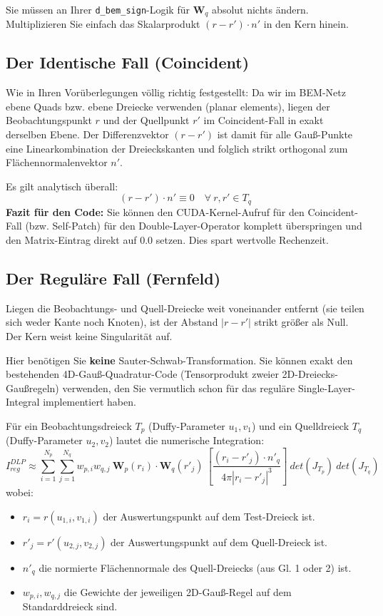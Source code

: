 \documentclass[11pt,a4paper]{article}
\begin{document}
Sie müssen an Ihrer \texttt{d\_bem\_sign}-Logik für $\mathbf{W}_q$ absolut nichts ändern. Multiplizieren Sie einfach das Skalarprodukt $(r - r') \cdot n'$ in den Kern hinein.

\subsection{Der Identische Fall (Coincident)}

Wie in Ihren Vorüberlegungen völlig richtig festgestellt: Da wir im BEM-Netz ebene Quads bzw. ebene Dreiecke verwenden (planar elements), liegen der Beobachtungspunkt $r$ und der Quellpunkt $r'$ im Coincident-Fall in exakt derselben Ebene. 
Der Differenzvektor $(r - r')$ ist damit für alle Gauß-Punkte eine Linearkombination der Dreieckskanten und folglich strikt orthogonal zum Flächennormalenvektor $n'$.

Es gilt analytisch überall:
\begin{equation}
    (r - r') \cdot n' \equiv 0 \quad \forall \ r, r' \in T_q
\end{equation}
\textbf{Fazit für den Code:} Sie können den CUDA-Kernel-Aufruf für den Coincident-Fall (bzw. Self-Patch) für den Double-Layer-Operator komplett überspringen und den Matrix-Eintrag direkt auf $0.0$ setzen. Dies spart wertvolle Rechenzeit.

\subsection{Der Reguläre Fall (Fernfeld)}

Liegen die Beobachtungs- und Quell-Dreiecke weit voneinander entfernt (sie teilen sich weder Kante noch Knoten), ist der Abstand $|r - r'|$ strikt größer als Null. Der Kern weist keine Singularität auf.

Hier benötigen Sie \textbf{keine} Sauter-Schwab-Transformation. Sie können exakt den bestehenden 4D-Gauß-Quadratur-Code (Tensorprodukt zweier 2D-Dreiecks-Gaußregeln) verwenden, den Sie vermutlich schon für das reguläre Single-Layer-Integral implementiert haben.

Für ein Beobachtungsdreieck $T_p$ (Duffy-Parameter $u_1, v_1$) und ein Quelldreieck $T_q$ (Duffy-Parameter $u_2, v_2$) lautet die numerische Integration:
\begin{equation}
    I_{reg}^{DLP} \approx \sum_{i=1}^{N_p} \sum_{j=1}^{N_q} w_{p,i} w_{q,j} \ \mathbf{W}_p(r_i) \cdot \mathbf{W}_q(r'_j) \ \left[ \frac{(r_i - r'_j) \cdot n'_q}{4\pi |r_i - r'_j|^3} \right] \ det(J_{T_p}) \ det(J_{T_q})
\end{equation}
wobei:
\begin{itemize}
    \item $r_i = r(u_{1,i}, v_{1,i})$ der Auswertungspunkt auf dem Test-Dreieck ist.
    \item $r'_j = r'(u_{2,j}, v_{2,j})$ der Auswertungspunkt auf dem Quell-Dreieck ist.
    \item $n'_q$ die normierte Flächennormale des Quell-Dreiecks (aus Gl. 1 oder 2) ist.
    \item $w_{p,i}, w_{q,j}$ die Gewichte der jeweiligen 2D-Gauß-Regel auf dem Standarddreieck sind.
\end{itemize}
\end{document}
